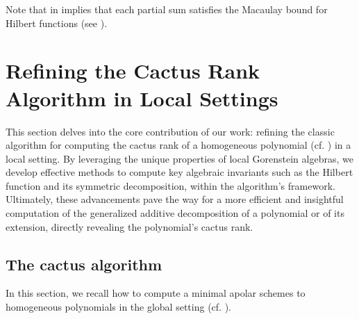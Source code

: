 \documentclass[a4paper,11p]{amsart}
\newcommand{\K}{\mathbb K}
\begin{document}
\noindent
Note that  in  implies that each partial sum satisfies the Macaulay bound for Hilbert functions (see \cite{Joachim}).

\section{Refining the Cactus Rank Algorithm in Local Settings}\label{sec:main}
This section delves into the core contribution of our work: refining the classic algorithm for computing the cactus rank of a homogeneous polynomial (cf. \cite{Alessandra}) in a local setting. By leveraging the unique properties of local Gorenstein algebras, we develop effective methods to compute key algebraic invariants such as  the Hilbert function and its symmetric decomposition, within the algorithm's framework. Ultimately, these advancements pave the way for a more efficient and insightful computation of the generalized additive decomposition of a polynomial or of its extension, directly revealing the polynomial's cactus rank.
\subsection{The cactus algorithm}\label{sec:algorithms}

In this section, we recall how to compute a minimal apolar schemes to homogeneous polynomials in the global setting (cf. \cite{Alessandra}).



\end{document}
